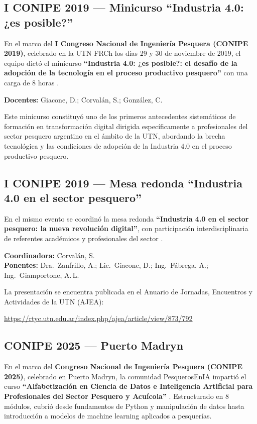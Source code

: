 \documentclass[12pt,a4paper]{article}
\begin{document}
\subsection{I CONIPE 2019 --- Minicurso ``Industria 4.0: ¿es posible?''}

En el marco del \textbf{I Congreso Nacional de Ingeniería Pesquera (CONIPE 2019)}, celebrado en la UTN FRCh los días 29 y 30 de noviembre de 2019, el equipo dictó el minicurso \textbf{``Industria 4.0: ¿es posible?: el desafío de la adopción de la tecnología en el proceso productivo pesquero''} con una carga de 8 horas \parencite{Giacone2019}.

\textbf{Docentes:} Giacone, D.; Corvalán, S.; González, C.

Este minicurso constituyó uno de los primeros antecedentes sistemáticos de formación en transformación digital dirigida específicamente a profesionales del sector pesquero argentino en el ámbito de la UTN, abordando la brecha tecnológica y las condiciones de adopción de la Industria 4.0 en el proceso productivo pesquero.

\subsection{I CONIPE 2019 --- Mesa redonda ``Industria 4.0 en el sector pesquero''}

En el mismo evento se coordinó la mesa redonda \textbf{``Industria 4.0 en el sector pesquero: la nueva revolución digital''}, con participación interdisciplinaria de referentes académicos y profesionales del sector \parencite{Corvalan2019}.

\textbf{Coordinadora:} Corvalán, S.\\
\textbf{Ponentes:} Dra.\ Zanfrillo, A.; Lic.\ Giacone, D.; Ing.\ Fábrega, A.; Ing.\ Giamportone, A.\,L.

La presentación se encuentra publicada en el Anuario de Jornadas, Encuentros y Actividades de la UTN (AJEA):
\begin{center}
  \url{https://rtyc.utn.edu.ar/index.php/ajea/article/view/873/792}
\end{center}

\subsection{CONIPE 2025 --- Puerto Madryn}

En el marco del \textbf{Congreso Nacional de Ingeniería Pesquera (CONIPE 2025)}, celebrado en Puerto Madryn, la comunidad PesquerosEnIA impartió el curso \textbf{``Alfabetización en Ciencia de Datos e Inteligencia Artificial para Profesionales del Sector Pesquero y Acuícola''} \parencite{PesquerosEnIA2025}. Estructurado en 8 módulos, cubrió desde fundamentos de Python y manipulación de datos hasta introducción a modelos de machine learning aplicados a pesquerías.
\end{document}
